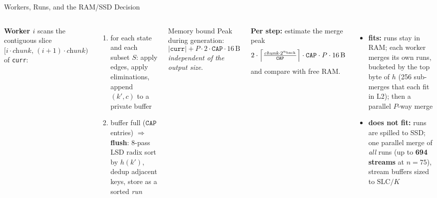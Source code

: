 \documentclass[aspectratio=169,t]{beamer}
\newcommand{\nb}{n_{\mathrm{back}}}
\newcommand{\curr}{\texttt{curr}}
\begin{document}
\begin{frame}{Workers, Runs, and the RAM/SSD Decision}
\small
\begin{columns}[t]
\textbf{Worker $i$} scans the contiguous slice
$[i\cdot\textit{chunk},\,(i{+}1)\cdot\textit{chunk})$ of \texttt{curr}:
\begin{enumerate}
  \item for each state and each subset $S$: apply edges, apply eliminations,
        append $(k',c)$ to a private buffer
  \item buffer full ($\texttt{CAP}$ entries) $\Rightarrow$ \textbf{flush}:
        8-pass LSD radix sort by $h(k')$, dedup adjacent keys, store as a sorted \emph{run}
\end{enumerate}

\vspace{0.1cm}
\begin{block}{Memory bound}
  Peak during generation:
  \[ |\curr| + P\cdot 2\cdot\texttt{CAP}\cdot 16\,\text{B} \]
  \emph{independent of the output size}.
\end{block}

\textbf{Per step:} estimate the merge peak
\[
  2\cdot\Bigl\lceil\tfrac{\textit{chunk}\cdot 2^{\nb}}{\texttt{CAP}}\Bigr\rceil
  \cdot \texttt{CAP}\cdot P\cdot 16\,\text{B}
\]
and compare with free RAM.

\vspace{0.1cm}
\begin{itemize}
  \item \textbf{fits:} runs stay in RAM; each worker merges its own runs,
        bucketed by the top byte of $h$ (256 sub-merges that each fit in L2);
        then a parallel $P$-way merge
  \item \textbf{does not fit:} runs are spilled to SSD; one parallel merge of
        \emph{all} runs (up to \textbf{694 streams} at $n=75$), stream buffers sized
        to $\text{SLC}/K$
\end{itemize}
\end{columns}
\end{frame}
\end{document}
